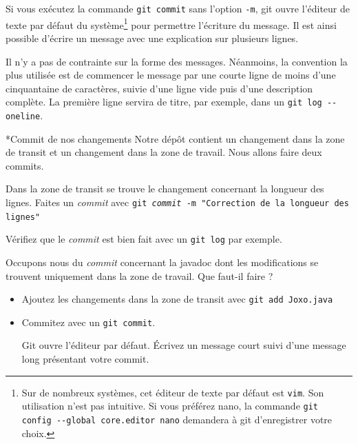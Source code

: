 \documentclass[a4paper,11pt]{style-esi/td}
\begin{document}
Si vous exécutez la commande \texttt{git commit} sans l’option \texttt{-m}, git
ouvre l’éditeur de texte par défaut du système\footnote{Sur de nombreux
	systèmes, cet éditeur de texte par défaut est \texttt{vim}. Son utilisation
	n’est pas intuitive. Si vous préférez nano, la commande \texttt{git config
	-{}-global core.editor nano} demandera à git d'enregistrer votre choix.
} pour permettre l’écriture du message. Il est ainsi possible d’écrire un
message avec une explication sur plusieurs lignes. 

Il n’y a pas de contrainte sur la forme des messages. Néanmoins, la convention
la plus utilisée est de commencer le message par une courte ligne de moins
d’une cinquantaine de caractères, suivie d’une ligne vide puis d’une
description complète. La première ligne servira de titre, par exemple, dans un
\texttt{git log -{}-oneline}. 



\begin{Exercice}*{Commit de nos changements}
	Notre dépôt contient un changement dans la zone de transit et un changement
	dans la zone de travail. Nous allons faire deux commits. 
	\begin{steps}
		
	\item Dans la zone de transit se trouve le changement concernant la
		longueur des lignes. Faites un \textit{commit} avec \texttt{git
			\textit{commit} -m "Correction de la longueur des lignes"}

		Vérifiez que le \textit{commit} est bien fait avec un \texttt{git log} par
		exemple. 

	\item Occupons nous du \textit{commit} concernant la javadoc dont les
		modifications se trouvent uniquement dans la zone de travail. Que
		faut-il faire ? 

		\begin{itemize}

			\item Ajoutez les changements dans la zone de transit avec
				\texttt{git add Joxo.java}

			\item Commitez avec un \texttt{git commit}.

				Git ouvre l'éditeur par défaut. Écrivez un message court suivi
				d'une message long présentant votre commit. 

		\end{itemize}

	\end{steps}
\end{Exercice}
\end{document}
